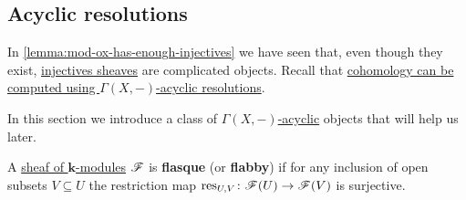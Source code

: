 \documentclass[../../main]{subfiles}
\begin{document}



\subsection{Acyclic resolutions}

In \autoref{lemma:mod-ox-has-enough-injectives} we have seen that, even though they exist, \hyperref[def:injective-projective-object]{injectives sheaves} are complicated objects.
Recall that \hyperref[thm:right-derived-functor-using-acyclics]{cohomology can be computed using \(\Gamma(X, -)\)-acyclic resolutions}.

In this section we introduce a class of \hyperref[def:F-acyclic-object]{\(\Gamma(X, -)\)-acyclic} objects that will help us later.

\begin{definition}\label{def:flasque-sheaf}
  A \hyperref[def:sheaf]{sheaf of \(\mathbf{k}\)-modules} \(\mathscr{F}\) is \textbf{flasque} (or \textbf{flabby}) if for any inclusion of open subsets \(V \subseteq U\) the restriction map \(\operatorname{res}_{U, V}\colon \mathscr{F}(U) \to \mathscr{F}(V)\) is surjective.
\end{definition}
\end{document}
